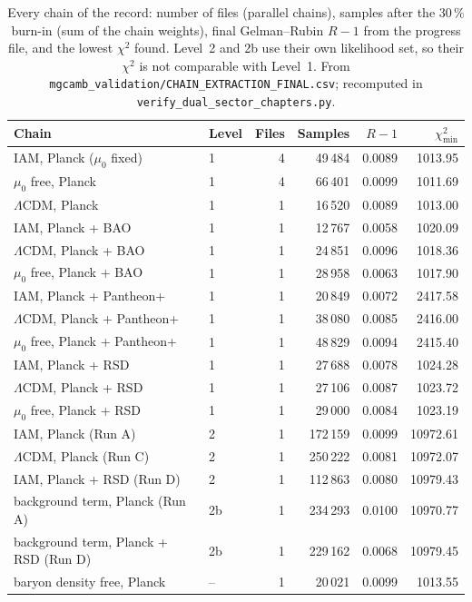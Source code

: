 \providecommand{\lightrowrule}{\arrayrulecolor{black!25}\specialrule{0.3pt}{0pt}{0pt}\arrayrulecolor{black}}
\begin{table}[htbp]\centering\small
\caption[Per-chain record]{Every chain of the record: number of files (parallel chains), samples after the $30\,\%$ burn-in (sum of the chain weights), final Gelman--Rubin $R-1$ from the progress
file, and the lowest $\chi^2$ found. Level~2 and 2b use their own likelihood set, so their $\chi^2$ is not comparable with Level~1. From
\texttt{mgcamb\_validation/\allowbreak{}CHAIN\_EXTRACTION\_FINAL.csv}; recomputed in \texttt{verify\_dual\_sector\_chapters.py}. \measured}\label{tab:chain_record}
\begin{tabular}{llrrrr}\toprule
Chain & Level & Files & Samples & $R-1$ & $\chi^2_{\min}$\\\midrule
IAM, Planck ($\mu_0$ fixed) & 1 & 4 & 49\,484 & 0.0089 & 1013.95\\\lightrowrule
$\mu_0$ free, Planck & 1 & 4 & 66\,401 & 0.0099 & 1011.69\\\lightrowrule
$\Lambda$CDM, Planck & 1 & 1 & 16\,520 & 0.0089 & 1013.00\\\lightrowrule
IAM, Planck + BAO & 1 & 1 & 12\,767 & 0.0058 & 1020.09\\\lightrowrule
$\Lambda$CDM, Planck + BAO & 1 & 1 & 24\,851 & 0.0096 & 1018.36\\\lightrowrule
$\mu_0$ free, Planck + BAO & 1 & 1 & 28\,958 & 0.0063 & 1017.90\\\lightrowrule
IAM, Planck + Pantheon+ & 1 & 1 & 20\,849 & 0.0072 & 2417.58\\\lightrowrule
$\Lambda$CDM, Planck + Pantheon+ & 1 & 1 & 38\,080 & 0.0085 & 2416.00\\\lightrowrule
$\mu_0$ free, Planck + Pantheon+ & 1 & 1 & 48\,829 & 0.0094 & 2415.40\\\lightrowrule
IAM, Planck + RSD & 1 & 1 & 27\,688 & 0.0078 & 1024.28\\\lightrowrule
$\Lambda$CDM, Planck + RSD & 1 & 1 & 27\,106 & 0.0087 & 1023.72\\\lightrowrule
$\mu_0$ free, Planck + RSD & 1 & 1 & 29\,000 & 0.0084 & 1023.19\\\lightrowrule
IAM, Planck (Run A) & 2 & 1 & 172\,159 & 0.0099 & 10972.61\\\lightrowrule
$\Lambda$CDM, Planck (Run C) & 2 & 1 & 250\,222 & 0.0081 & 10972.07\\\lightrowrule
IAM, Planck + RSD (Run D) & 2 & 1 & 112\,863 & 0.0080 & 10979.43\\\lightrowrule
background term, Planck (Run A) & 2b & 1 & 234\,293 & 0.0100 & 10970.77\\\lightrowrule
background term, Planck + RSD (Run D) & 2b & 1 & 229\,162 & 0.0068 & 10979.45\\\lightrowrule
baryon density free, Planck & -- & 1 & 20\,021 & 0.0099 & 1013.55\\\bottomrule
\end{tabular}
\end{table}
